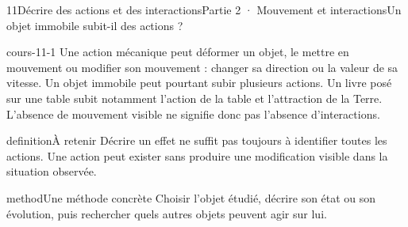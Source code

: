 \documentclass[12pt,twoside,openany]{book}
\begin{document}
\clearpage\pagestyle{otMain}
\begin{ouverture}[college2]{11}{Décrire des actions et des interactions}{Partie 2 · Mouvement et interactions}{Un objet immobile subit-il des actions ?}
\end{ouverture}
\label{ch-11-cours-1}
\label{ess-11}
\begin{pcFiche}{cours-11-1}
Une action mécanique peut déformer un objet, le mettre en mouvement ou modifier son mouvement : changer sa direction ou la valeur de sa vitesse. Un objet immobile peut pourtant subir plusieurs actions. Un livre posé sur une table subit notamment l’action de la table et l’attraction de la Terre. L’absence de mouvement visible ne signifie donc pas l’absence d’interactions.\par
{}
\begin{pcEncadre}{definition}{À retenir}
Décrire un effet ne suffit pas toujours à identifier toutes les actions. Une action peut exister sans produire une modification visible dans la situation observée.\par
\end{pcEncadre}
\begin{pcEncadre}{method}{Une méthode concrète}
Choisir l’objet étudié, décrire son état ou son évolution, puis rechercher quels autres objets peuvent agir sur lui.\par
\end{pcEncadre}
\end{pcFiche}
\label{ch-11-cours-2}
\end{document}
